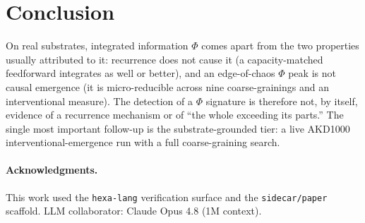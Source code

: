 \documentclass[11pt,a4paper]{article}
\begin{document}
\section{Conclusion}
\label{sec:conclusion}

On real substrates, integrated information $\Phi$ comes apart from the two
properties usually attributed to it: recurrence does not cause it (a
capacity-matched feedforward integrates as well or better), and an edge-of-chaos
$\Phi$ peak is not causal emergence (it is micro-reducible across nine
coarse-grainings and an interventional measure). The detection of a $\Phi$
signature is therefore not, by itself, evidence of a recurrence mechanism or of
``the whole exceeding its parts.'' The single most important follow-up is the
substrate-grounded tier: a live AKD1000 interventional-emergence run with a full
coarse-graining search.

\paragraph{Acknowledgments.}
This work used the \texttt{hexa-lang} verification surface and the
\texttt{sidecar/paper} scaffold. LLM collaborator: Claude Opus 4.8 (1M context).



\end{document}
